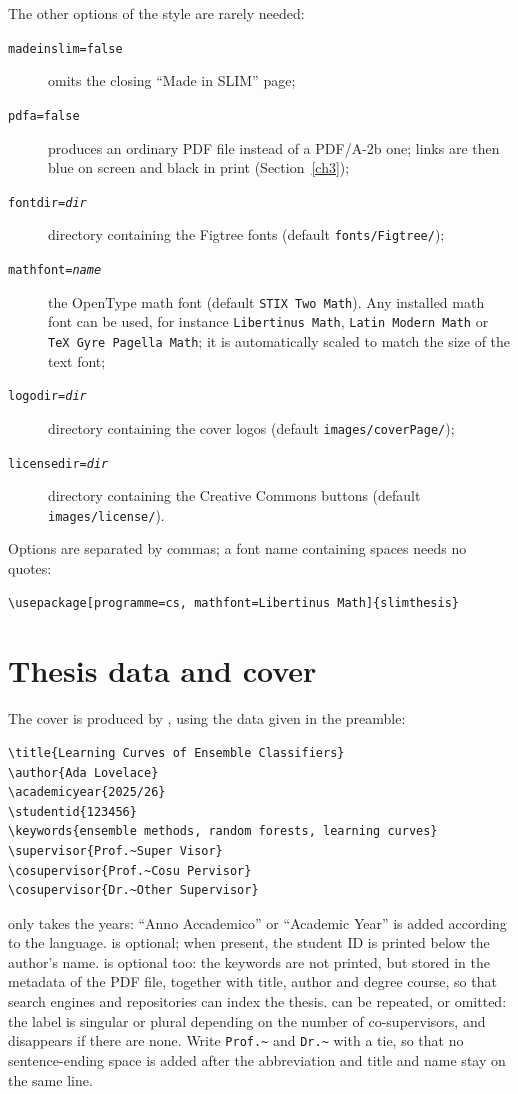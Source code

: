 The other options of the style are rarely needed:
\begin{description}
  \item[\texttt{madeinslim=false}] omits the closing ``Made in SLIM'' page;
  \item[\texttt{pdfa=false}] produces an ordinary PDF file instead of a
    PDF/A-2b one; links are then blue on screen and black in print
    (Section~\ref{ch3});
  \item[\texttt{fontdir=\textrm{\emph{dir}}}] directory containing the
    Figtree fonts (default \nolinkurl{fonts/Figtree/});
  \item[\texttt{mathfont=\textrm{\emph{name}}}] the OpenType math font
    (default \texttt{STIX Two Math}). Any installed math font can be used,
    for instance \texttt{Libertinus Math}, \texttt{Latin Modern Math} or
    \texttt{TeX Gyre Pagella Math}; it is automatically scaled to match the
    size of the text font;
  \item[\texttt{logodir=\textrm{\emph{dir}}}] directory containing the cover
    logos (default \nolinkurl{images/coverPage/});
  \item[\texttt{licensedir=\textrm{\emph{dir}}}] directory containing the
    Creative Commons buttons (default \nolinkurl{images/license/}).
\end{description}
Options are separated by commas; a font name containing spaces needs no
quotes:
\begin{Verbatim}
\usepackage[programme=cs, mathfont=Libertinus Math]{slimthesis}
\end{Verbatim}

\section{Thesis data and cover} \label{sec:data}

The cover is produced by , using the data given in the
preamble:
\begin{Verbatim}
\title{Learning Curves of Ensemble Classifiers}
\author{Ada Lovelace}
\academicyear{2025/26}
\studentid{123456}
\keywords{ensemble methods, random forests, learning curves}
\supervisor{Prof.~Super Visor}
\cosupervisor{Prof.~Cosu Pervisor}
\cosupervisor{Dr.~Other Supervisor}
\end{Verbatim}
 only takes the years: ``Anno Accademico'' or ``Academic
Year'' is added according to the language.  is optional; when
present, the student ID is printed below the author's name. 
is optional too: the keywords are not printed, but stored in the metadata of
the PDF file, together with title, author and degree course, so that search
engines and repositories can index the thesis.
 can be repeated, or omitted: the label is singular or
plural depending on the number of co-supervisors, and disappears if there
are none. Write \verb|Prof.~| and \verb|Dr.~| with a tie, so that no
sentence-ending space is added after the abbreviation and title and name
stay on the same line.

